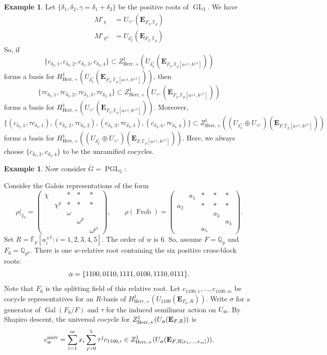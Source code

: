 \documentclass[11pt]{amsart}
\newcommand{\MINOREDITED}[1]{#1}
\newcommand{\MAJOREDIT}[1]{{\color{revisiongreen}#1}}
\theoremstyle{definition}
\newtheorem{example}[thm]{Example}
\newcommand{\doublestroke}[1]{\pdfliteral{1 Tr .3 w}#1\pdfliteral{0 Tr 0 w}}
\newcommand{\Balpha}{\doublestroke{\alpha}}
\newcommand{\Q}{\mathbb{Q}}
\newcommand{\bfE}{\mathbf{E}}
\newcommand{\bFp}{\bar{\mathbb{F}}_p}
\newcommand{\bG}{\breve{G}}
\newcommand{\univ}{{\operatorname{univ}}}
\DeclareMathOperator{\PGL}{PGL}
\DeclareMathOperator{\Frob}{Frob}
\DeclareMathOperator{\GL}{GL}
\DeclareMathOperator{\Gal}{Gal}
\newcommand{\Herr}{\mathrm{Herr}}
\begin{document}
\begin{example}
Let $\{\MINOREDITED{\delta_1}, \delta_2, \gamma=\delta_1+\delta_2\}$
be the positive roots of $\GL_3$.
We have
\begin{align*}
M'_{\chi} &= U_{\gamma^\vee}(\bfE_{F_2,\bFp})
\\
M'_{\chi^p} &= U_{\delta_2^\vee}(\bfE_{F_2,\bFp})
\end{align*}
So, if
\[
\{c_{\delta_2, 1}, c_{\delta_2,2}, c_{\delta_2,3},
c_{\delta_2,4}
\}
\subset Z^1_{\Herr,+}
(U_{\delta_2^\vee}(\bfE_{F_2,\bFp[a^{\pm1},b^{\pm1}]}))
\]
forms a basis for
$H^1_{\Herr,+}(
U_{\delta_2^\vee}(\bfE_{F_2,\bFp[a^{\pm1},b^{\pm1}]}))$,
then
\[
\{\tau c_{\delta_2, 1}, \tau c_{\delta_2,2}, \tau c_{\delta_2,3},
\tau c_{\delta_2,\MINOREDITED{4}}
\}
\subset Z^1_{\Herr,+}(
U_{\gamma^\vee}(\bfE_{F_2,\bFp[a^{\pm1},b^{\pm1}]}))
\]
forms a basis for
$H^1_{\Herr,+}(
U_{\gamma^\vee}(\bfE_{F_2,\bFp[a^{\pm1},b^{\pm1}]}))$.
Moreover,
\[
\{
(c_{\delta_2,1}, \tau c_{\delta_2,1}),
(c_{\delta_2,2}, \tau c_{\delta_2,2}),
(c_{\delta_2,3}, \tau c_{\delta_2,3}),
(c_{\delta_2,4}, \tau c_{\delta_2,4})
\}
\subset Z^1_{\Herr,+}(
(U_{\delta_2^\vee}\oplus U_{\gamma^\vee})(\bfE_{F,\bFp[a^{\pm1},b^{\pm1}]}))
\]
forms a basis for
$H^1_{\Herr,+}(
(U_{\delta_2^\vee}\oplus U_{\gamma^\vee})(\bfE_{F,\bFp[a^{\pm1},b^{\pm1}]}))
$.
Here, we always choose
$\{c_{\delta_2, 3}, c_{\delta_2,4}\}$ \MINOREDITED{to be} the unramified cocycles.
\end{example}

\begin{example}
Now consider $\bG=\PGL_5$:

\blockFive

Consider the Galois representations of the form
\[
\rho|_{I_n}
=
\begin{pmatrix}
\chi & & * & * & * \\
& \chi^p & * & * & * \\
& & \omega & & \\
& & & \omega^p & \\
& & & & \omega^{p^2}
\end{pmatrix},
\qquad
\rho(\Frob)
=
\begin{pmatrix}
& a_1 & * & * & * \\
a_2 & & * & *& * \\
& & & a_3 & \\
& &  & & a_4 \\
& & a_5 & &
\end{pmatrix}.
\]
Set $R=\bFp[a_i^{\pm1}:i=1,2,3,4,5]$.
The order of $w$ is $6$.
So, assume $F=\Q_p$
and $F_6=\Q_{p^6}$.
\MINOREDITED{There is one $w$-relative root containing the six positive cross-block roots:
\[
\Balpha = \{1100,0110,1111,0100,1110,0111\}.
\]}
\MAJOREDIT{Note that
$F_6$ is the splitting field of this relative root. Let
$c_{1100,1},\ldots,c_{1100,m}$ be cocycle representatives for an $R$-basis of
$H^1_{\Herr,+}(U_{1100}(\bfE_{F_6,R}))$. Write $\sigma$ for a generator of
$\Gal(F_6/F)$ and $\tau$ for the induced semilinear action on
$U_{\Balpha}$. By Shapiro descent, the universal cocycle for
$Z^1_{\Herr,+}(U_{\Balpha}(\bfE_{F,R}))$ is
\[
c_{\Balpha}^\univ
=
\sum_{i=1}^m x_i\sum_{j=0}^{5}\tau^j c_{1100,i}
\in Z^1_{\Herr,+}(U_{\Balpha}(\bfE_{F,R[x_1,\ldots,x_m]})).
\]}
\end{example}
\end{document}
